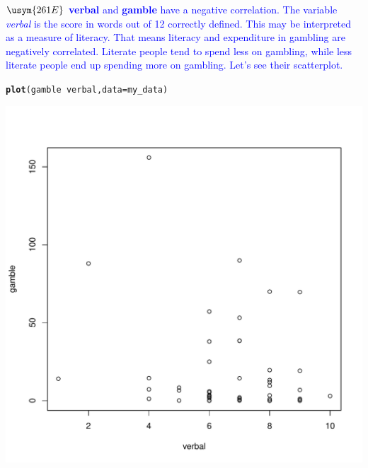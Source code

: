\documentclass[11pt, a4paper]{article}\usepackage[]{graphicx}\usepackage[]{xcolor}
\makeatletter
\def\maxwidth{ %
  \ifdim\Gin@nat@width>\linewidth
    \linewidth
  \else
    \Gin@nat@width
  \fi
}
\newcommand{\hlopt}[1]{\textcolor[rgb]{0,0,0}{#1}}%
\newcommand{\hlstd}[1]{\textcolor[rgb]{0.345,0.345,0.345}{#1}}%
\newcommand{\hlkwc}[1]{\textcolor[rgb]{0.333,0.667,0.333}{#1}}%
\newcommand{\hlkwd}[1]{\textcolor[rgb]{0.737,0.353,0.396}{\textbf{#1}}}%
\newenvironment{kframe}{%
 \def\at@end@of@kframe{}%
 \ifinner\ifhmode%
  \def\at@end@of@kframe{\end{minipage}}%
  \begin{minipage}{\columnwidth}%
 \fi\fi%
 \def\FrameCommand##1{\hskip\@totalleftmargin \hskip-\fboxsep
 \colorbox{shadecolor}{##1}\hskip-\fboxsep
     \hskip-\linewidth \hskip-\@totalleftmargin \hskip\columnwidth}%
 \MakeFramed {\advance\hsize-\width
   \@totalleftmargin\z@ \linewidth\hsize
   \@setminipage}}%
 {\par\unskip\endMakeFramed%
 \at@end@of@kframe}
\newenvironment{knitrout}{}{} %
\makeatother
\begin{document}
$\usym{261E}$ \textcolor{blue}{\textbf{verbal} and \textbf{gamble} have a negative correlation. The variable \textit{verbal} is the score in words out of 12 correctly defined. This may be interpreted as a measure of literacy. That means literacy and expenditure in gambling are negatively correlated. Literate people tend to spend less on gambling, while less literate people end up spending more on gambling. Let's see their scatterplot.}
\begin{knitrout}
\color{fgcolor}\begin{kframe}
\begin{alltt}
\hlkwd{plot}\hlstd{(gamble} \hlopt{~} \hlstd{verbal,} \hlkwc{data} \hlstd{= my_data)}
\end{alltt}
\end{kframe}
\includegraphics[width=\maxwidth]{figure/unnamed-chunk-17-1} 
\end{knitrout}

\newpage
\end{document}
